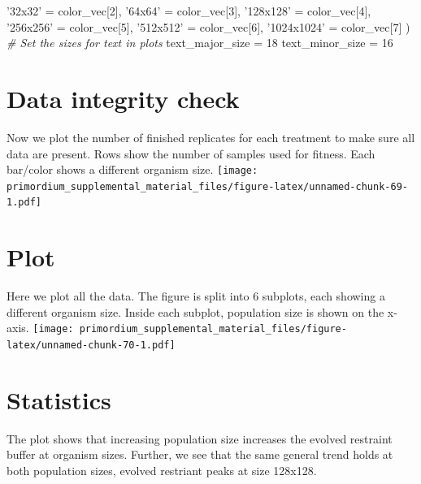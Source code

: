 \documentclass[]{book}
\newenvironment{Shaded}{\begin{snugshade}}{\end{snugshade}}
\newcommand{\CommentTok}[1]{\textcolor[rgb]{0.56,0.35,0.01}{\textit{#1}}}
\newcommand{\DecValTok}[1]{\textcolor[rgb]{0.00,0.00,0.81}{#1}}
\newcommand{\NormalTok}[1]{#1}
\newcommand{\StringTok}[1]{\textcolor[rgb]{0.31,0.60,0.02}{#1}}
\begin{document}
\begin{Shaded}
\begin{Highlighting}[]
  \StringTok{'32x32'}\NormalTok{ =}\StringTok{     }\NormalTok{color_vec[}\DecValTok{2}\NormalTok{],}
  \StringTok{'64x64'}\NormalTok{ =}\StringTok{     }\NormalTok{color_vec[}\DecValTok{3}\NormalTok{],}
  \StringTok{'128x128'}\NormalTok{ =}\StringTok{   }\NormalTok{color_vec[}\DecValTok{4}\NormalTok{],}
  \StringTok{'256x256'}\NormalTok{ =}\StringTok{   }\NormalTok{color_vec[}\DecValTok{5}\NormalTok{],}
  \StringTok{'512x512'}\NormalTok{ =}\StringTok{   }\NormalTok{color_vec[}\DecValTok{6}\NormalTok{],}
  \StringTok{'1024x1024'}\NormalTok{ =}\StringTok{ }\NormalTok{color_vec[}\DecValTok{7}\NormalTok{]}
\NormalTok{)}
\CommentTok{# Set the sizes for text in plots}
\NormalTok{text_major_size =}\StringTok{ }\DecValTok{18}
\NormalTok{text_minor_size =}\StringTok{ }\DecValTok{16} 
\end{Highlighting}
\end{Shaded}

\hypertarget{data-integrity-check-4}{%
\section{Data integrity check}\label{data-integrity-check-4}}

Now we plot the number of finished replicates for each treatment to make sure all data are present.
Rows show the number of samples used for fitness.
Each bar/color shows a different organism size.
\texttt{[image: primordium\_supplemental\_material\_files/figure-latex/unnamed-chunk-69-1.pdf]}

\hypertarget{plot-1}{%
\section{Plot}\label{plot-1}}

Here we plot all the data.
The figure is split into 6 subplots, each showing a different organism size.
Inside each subplot, population size is shown on the x-axis.
\texttt{[image: primordium\_supplemental\_material\_files/figure-latex/unnamed-chunk-70-1.pdf]}

\hypertarget{statistics-4}{%
\section{Statistics}\label{statistics-4}}

The plot shows that increasing population size increases the evolved restraint buffer at organism sizes.
Further, we see that the same general trend holds at both population sizes, evolved restriant peaks at size 128x128.
\end{document}
